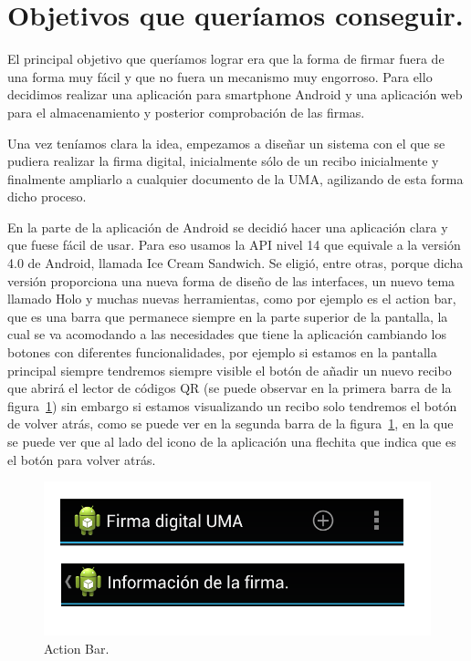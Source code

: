 \section{Objetivos que queríamos conseguir.}

El principal objetivo que queríamos lograr era que la forma de firmar fuera de una forma muy fácil y que no fuera un mecanismo muy engorroso. Para ello decidimos realizar una aplicación para smartphone Android y una aplicación web para el almacenamiento y posterior comprobación de las firmas.

Una vez teníamos clara la idea, empezamos a diseñar un sistema con el que se pudiera realizar la firma digital, inicialmente sólo de un recibo inicialmente y finalmente ampliarlo a cualquier documento de la UMA, agilizando de esta forma dicho proceso.


En la parte de la aplicación de Android se decidió hacer una aplicación clara y que fuese fácil de usar. Para eso usamos la API nivel 14 que equivale a la versión 4.0 de Android, llamada Ice Cream Sandwich. Se eligió, entre otras, porque dicha versión proporciona una nueva forma de diseño de las interfaces, un nuevo tema llamado Holo y muchas nuevas herramientas, como por ejemplo es el action bar, que es una barra que permanece siempre en la parte superior de la pantalla, la cual se va acomodando a las necesidades que tiene la aplicación cambiando los botones con diferentes funcionalidades, por ejemplo si estamos en la pantalla principal siempre tendremos siempre visible el botón de añadir un nuevo recibo que abrirá el lector de códigos QR (se puede observar en la primera barra de la figura~\ref{fig:actionBar}) sin embargo si estamos visualizando un recibo solo tendremos el botón de volver atrás, como se puede ver en la segunda barra de la figura~\ref{fig:actionBar}, en la que se puede ver que al lado del icono de la aplicación una flechita que indica que es el botón para volver atrás.

\begin{figure}
  \centering
    \includegraphics[scale=0.3]{./Introduccion/imagenes/actionbar.png}
  \caption{Action Bar.}
  \label{fig:actionBar}
\end{figure}

